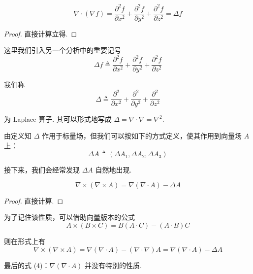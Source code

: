 \begin{property}[式 (2)]
$$
\nabla\cdot(\nabla f)=\frac{\partial^2f}{\partial x^2}+\frac{\partial^2f}{\partial y^2}+\frac{\partial^2f}{\partial z^2}=\Delta f
$$
\end{property}
\begin{proof}
    直接计算立得.
\end{proof}

这里我们引入另一个分析中的重要记号
$$
\Delta f\triangleq\frac{\partial^2f}{\partial x^2}+\frac{\partial^2f}{\partial y^2}+\frac{\partial^2f}{\partial z^2}
$$

我们称
$$
\Delta\triangleq\frac{\partial^2}{\partial x^2}+\frac{\partial^2}{\partial y^2}+\frac{\partial^2}{\partial z^2}
$$

为 Laplace 算子. 其可以形式地写成 $\Delta=\nabla\cdot\nabla=\nabla^2$.

由定义知 $\Delta$ 作用于标量场，但我们可以按如下的方式定义，使其作用到向量场 $A$ 上：
$$
\Delta A\triangleq(\Delta A_1,\Delta A_2,\Delta A_3)
$$

接下来，我们会经常发现 $\Delta A$ 自然地出现.

\begin{property}[式 (3)]
$$
\nabla\times(\nabla\times A)=\nabla(\nabla\cdot A)-\Delta A
$$
\end{property}
\begin{proof}
    直接计算.
\end{proof}

为了记住该性质，可以借助向量版本的公式
$$
A\times(B\times C)=B(A\cdot C)-(A\cdot B)C
$$

则在形式上有
$$
\nabla\times(\nabla\times A)=\nabla(\nabla\cdot A)-(\nabla\cdot\nabla)A=\nabla(\nabla\cdot A)-\Delta A
$$

最后的式 (4)：$\nabla(\nabla\cdot A)$ 并没有特别的性质.